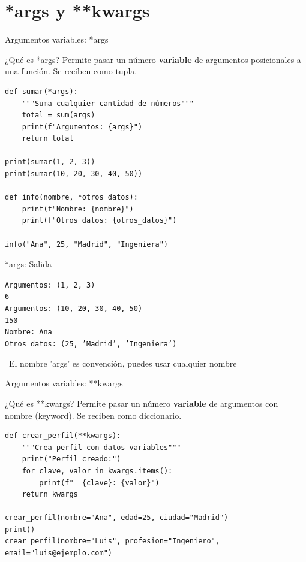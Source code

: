 \documentclass{beamer}
\begin{document}
\section{*args y **kwargs}

\begin{frame}[fragile]{Argumentos variables: *args \faEllipsisH}
\begin{conceptbox}{¿Qué es *args?}
Permite pasar un número \textbf{variable} de argumentos posicionales a una función. Se reciben como tupla.
\end{conceptbox}

\begin{lstlisting}
def sumar(*args):
    """Suma cualquier cantidad de números"""
    total = sum(args)
    print(f"Argumentos: {args}")
    return total

print(sumar(1, 2, 3))
print(sumar(10, 20, 30, 40, 50))

def info(nombre, *otros_datos):
    print(f"Nombre: {nombre}")
    print(f"Otros datos: {otros_datos}")

info("Ana", 25, "Madrid", "Ingeniera")
\end{lstlisting}
\end{frame}

\begin{frame}[fragile]{*args: Salida \faArrowCircleRight}
\begin{tcolorbox}[colback=green!10,colframe=green,title={\small\faArrowCircleRight \ Salida},coltitle=fg0,left=3pt,right=3pt,top=3pt,bottom=3pt,boxsep=2pt]
\small\texttt{Argumentos: (1, 2, 3)\\
6\\
Argumentos: (10, 20, 30, 40, 50)\\
150\\
Nombre: Ana\\
Otros datos: (25, 'Madrid', 'Ingeniera')}
\end{tcolorbox}

\vspace{0.3cm}
\begin{notebox}
\small\faInfoCircle\ El nombre 'args' es convención, puedes usar cualquier nombre
\end{notebox}
\end{frame}

\begin{frame}[fragile]{Argumentos variables: **kwargs \faKey}
\begin{conceptbox}{¿Qué es **kwargs?}
Permite pasar un número \textbf{variable} de argumentos con nombre (keyword). Se reciben como diccionario.
\end{conceptbox}

\begin{lstlisting}
def crear_perfil(**kwargs):
    """Crea perfil con datos variables"""
    print("Perfil creado:")
    for clave, valor in kwargs.items():
        print(f"  {clave}: {valor}")
    return kwargs

crear_perfil(nombre="Ana", edad=25, ciudad="Madrid")
print()
crear_perfil(nombre="Luis", profesion="Ingeniero", email="luis@ejemplo.com")
\end{lstlisting}
\end{frame}
\end{document}
